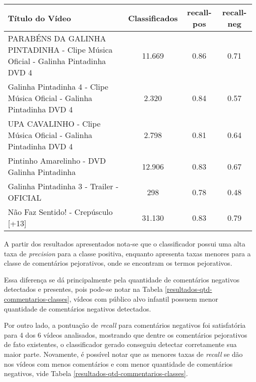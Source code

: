 \begin{table}[H] \footnotesize
\centering
	
\begin{tabular}{|p{5.5cm}|c|c|c|}
\hline
\textbf{Título do Vídeo} & \textbf{Classificados} & \textbf{recall-pos} & \textbf{recall-neg} \\ \hline
PARABÉNS DA GALINHA PINTADINHA - Clipe Música Oficial - Galinha Pintadinha DVD 4 & 11.669 & 0.86 & 0.71 \\ \hline
Galinha Pintadinha 4 - Clipe Música Oficial - Galinha Pintadinha DVD 4 & 2.320 & 0.84 & 0.57 \\ \hline
UPA CAVALINHO - Clipe Música Oficial - Galinha Pintadinha DVD 4 & 2.798 & 0.81 & 0.64 \\ \hline
Pintinho Amarelinho - DVD Galinha Pintadinha & 12.906 & 0.83 & 0.67 \\ \hline
Galinha Pintadinha 3 - Trailer - OFICIAL & 298 & 0.78 & 0.48 \\ \hline
Não Faz Sentido! - Crepúsculo [+13] & 31.130 & 0.83 & 0.79\\ \hline
\end{tabular}

\end{table}

A partir dos resultados apresentados nota-se que o classificador possui uma alta taxa de \textit{precision} para a classe positiva, enquanto apresenta taxas menores para a classe de comentários pejorativos, onde se encontram os termos pejorativos.

Essa diferença se dá principalmente pela quantidade de comentários negativos detectados e presentes, pois pode-se notar na Tabela \ref{resultados-qtd-commentarios-classes}, vídeos com público alvo infantil possuem menor quantidade de comentários negativos detectados.

Por outro lado, a pontuação de \textit{recall} para comentários negativos foi satisfatória para 4 dos 6 vídeos analisados, mostrando que dentre os comentários pejorativos de fato existentes, o classificador gerado conseguiu detectar corretamente sua maior parte. Novamente, é possível notar que as menores taxas de \textit{recall} se dão nos vídeos com menos comentários e com menor quantidade de comentários negativos, vide Tabela \ref{resultados-qtd-commentarios-classes}.
